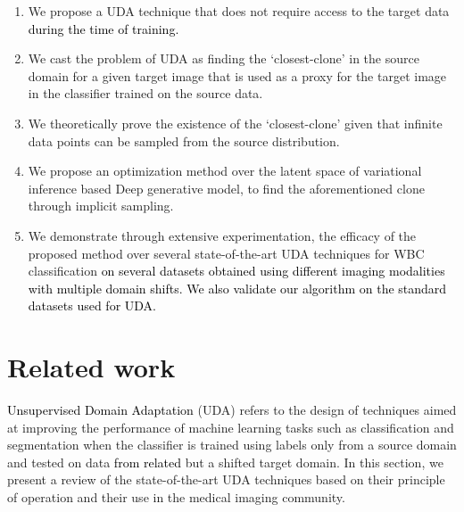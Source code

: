 \documentclass[journal,twoside,web]{IEEEtran}
\newcommand{\cc}{\textcolor{black}}
\newcommand{\bb}{\textcolor{black}}
\begin{document}
\begin{enumerate}
 
    \item We propose a UDA technique that does not require access to the target data \bb{during the time of training.}   
    \item We cast the problem of UDA as finding the `closest-clone' in the source domain for a given target image that is used as a proxy for the target image in the classifier trained on the source data.
    \item We theoretically prove the existence of the `closest-clone' given that infinite data points can be sampled from the source distribution. 
    \item We propose an optimization method over the latent space of variational inference based Deep generative model, to find the aforementioned clone through implicit sampling. 
    \item We demonstrate through extensive experimentation, the efficacy of the proposed method over several state-of-the-art UDA techniques for WBC classification \bb{on several datasets obtained using different imaging modalities with multiple domain shifts. We also validate our algorithm on the standard datasets used for UDA.}
\end{enumerate}















































\section{Related work}
\cc{Unsupervised Domain Adaptation} (UDA) refers to the design of techniques aimed at improving the performance of machine learning tasks such as classification and segmentation when the classifier is trained using labels only from a source domain and tested on data \cc{from related} but a shifted target domain. In this section, we present a review of the state-of-the-art UDA techniques based on their principle of operation and their use in the medical imaging community. 
\end{document}
